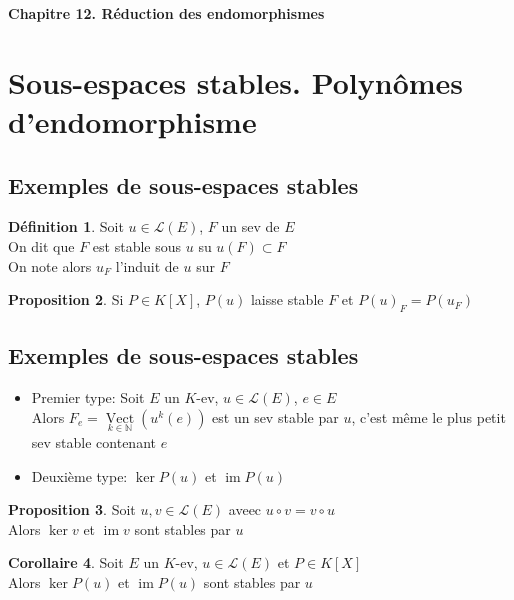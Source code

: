 \documentclass[10pt,a4paper]{article}
\theoremstyle{definition}
\newtheorem{proposition}{Proposition}[section]
\newtheorem{corollaire}[proposition]{Corollaire}
\newtheorem{definition}[proposition]{Définition}
\DeclareMathOperator*{\Vect}{Vect}
\DeclareMathOperator{\im}{im}
\begin{document}
\renewcommand{\labelitemi}{\textbullet}
\renewcommand{\labelenumi}{(\roman{enumi})}
\begin{center}
{\Large \textbf{Chapitre 12. Réduction des endomorphismes}}
\end{center}

\section{Sous-espaces stables. Polynômes d'endomorphisme}
\subsection{Exemples de sous-espaces stables}
\begin{definition}
Soit $u \in \mathcal{L}(E)$, $F$ un sev de $E$ \\
On dit que $F$ est stable sous $u$ su $u(F) \subset F$ \\
On note alors $u_F$ l'induit de $u$ sur $F$
\end{definition}
\begin{proposition}
Si $P \in K[X]$, $P(u)$ laisse stable $F$ et $\boxed{P(u)_F = P(u_F)}$
\end{proposition}

\subsection{Exemples de sous-espaces stables}
\noindent \begin{itemize}
\item Premier type: Soit $E$ un $K$-ev, $u \in \mathcal{L}(E)$, $e \in E$ \\
Alors $F_e = \Vect\limits_{k \in \mathbb{N}}(u^k(e))$ est un sev stable par $u$, c'est même le plus petit sev stable contenant $e$
\item Deuxième type: $\ker P(u)$ et $\im P(u)$
\end{itemize}
\begin{proposition}
Soit $u, v \in \mathcal{L}(E)$ aveec $u \circ v = v \circ u$ \\
Alors $\ker v$ et $\im v$ sont stables par $u$
\end{proposition}
\begin{corollaire}
Soit $E$ un $K$-ev, $u \in \mathcal{L}(E)$ et $P \in K[X]$ \\
Alors $\ker P(u)$ et $\im P(u)$ sont stables par $u$
\end{corollaire}
\end{document}
